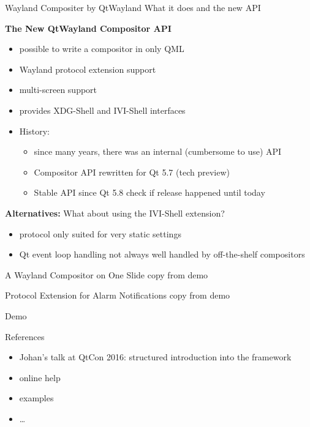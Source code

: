 \documentclass[ucs,9pt]{beamer}
\begin{document}
\begin{frame}
    {Wayland Compositer by QtWayland}
    {What it does and the new API}

    \textbf{The New QtWayland Compositor API}
    \begin{itemize}
        \item possible to write a compositor in only QML
        \item Wayland protocol extension support
        \item multi-screen support
        \item provides XDG-Shell and IVI-Shell interfaces
        \item History:
            \begin{itemize}
                \item since many years, there was an internal (cumbersome to use) API
                \item Compositor API rewritten for Qt 5.7 (tech preview)
                \item Stable API since Qt 5.8 \alert{check if release happened until today}
            \end{itemize}
    \end{itemize}
    \medskip

    \textbf{Alternatives:} What about using the IVI-Shell extension?
    \begin{itemize}
        \item protocol only suited for very static settings
        \item Qt event loop handling not always well handled by off-the-shelf compositors
    \end{itemize}
\end{frame}

\begin{frame}
    {A Wayland Compositor on One Slide}
    \alert{copy from demo}
\end{frame}

\begin{frame}
    {Protocol Extension for Alarm Notifications}
    \alert{copy from demo}
\end{frame}

\begin{frame}
    {Demo}
\end{frame}

\begin{frame}
    {References}

    \begin{itemize}
        \item Johan's talk at QtCon 2016: structured introduction into the framework
        \item online help
        \item examples
        \item \dots
    \end{itemize}
\end{frame}

\KDElastframe
\end{document}
